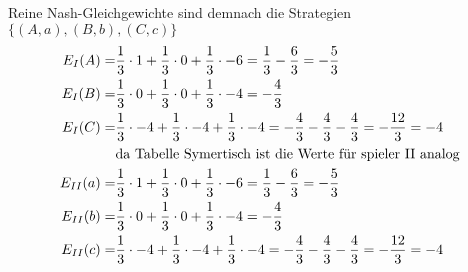 \documentclass[a4paper, 11pt]{article}
\newcommand{\RM}[1]{\MakeUppercase{\romannumeral #1}}
\begin{document}
Reine Nash-Gleichgewichte sind demnach die Strategien $\{(A,a),(B,b),(C,c)\}$\\

\begin{align}
	E_\RM{1}(A) = & \frac{1}{3} \cdot 1 + \frac{1}{3} \cdot 0 + \frac{1}{3} \cdot -6 = \frac{1}{3} - \frac{6}{3} = -\frac{5}{3}\\
	E_\RM{1}(B) = & \frac{1}{3} \cdot 0 + \frac{1}{3} \cdot 0 + \frac{1}{3} \cdot -4 = - \frac{4}{3}\\
	E_\RM{1}(C) = & \frac{1}{3} \cdot -4 + \frac{1}{3} \cdot -4 + \frac{1}{3} \cdot -4 = - \frac{4}{3} - \frac{4}{3} - \frac{4}{3} = -\frac{12}{3} = -4\\
	& \text{da Tabelle Symertisch ist die Werte für spieler \RM{2} analog}\\
	E_\RM{2}(a) = & \frac{1}{3} \cdot 1 + \frac{1}{3} \cdot 0 + \frac{1}{3} \cdot -6 = \frac{1}{3} - \frac{6}{3} = -\frac{5}{3}\\
	E_\RM{2}(b) = & \frac{1}{3} \cdot 0 + \frac{1}{3} \cdot 0 + \frac{1}{3} \cdot -4 = - \frac{4}{3}\\
	E_\RM{2}(c) = & \frac{1}{3} \cdot -4 + \frac{1}{3} \cdot -4 + \frac{1}{3} \cdot -4 = - \frac{4}{3} - \frac{4}{3} - \frac{4}{3} = -\frac{12}{3} = -4
\end{align}
\end{document}
